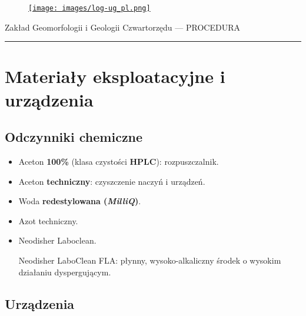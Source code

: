\documentclass[
  letterpaper,
  DIV=11,
  numbers=noendperiod]{scrreprt}
\begin{document}
\begin{figure}

\href{https://geomorfologia.ug.edu.pl}{\texttt{[image: images/log-ug\_pl.png]}}

\end{figure}

Zakład Geomorfologii i Geologii Czwartorzędu --- PROCEDURA

\begin{center}\rule{0.5\linewidth}{0.5pt}\end{center}

\hypertarget{materiaux142y-eksploatacyjne-i-urzux105dzenia-1}{%
\section{Materiały eksploatacyjne i
urządzenia}\label{materiaux142y-eksploatacyjne-i-urzux105dzenia-1}}

\hypertarget{odczynniki-chemiczne-1}{%
\subsection{Odczynniki chemiczne}\label{odczynniki-chemiczne-1}}

\begin{itemize}
\item
  Aceton \textbf{100\%} (klasa czystości \textbf{HPLC}): rozpuszczalnik.
\item
  Aceton \textbf{techniczny}: czyszczenie naczyń i urządzeń.
\item
  Woda \textbf{redestylowana (\emph{MilliQ})}.
\item
  Azot techniczny.
\item
  Neodisher Laboclean.

  Neodisher LaboClean FLA: płynny, wysoko-alkaliczny środek o wysokim
  działaniu dyspergującym.
\end{itemize}

\hypertarget{urzux105dzenia-1}{%
\subsection{Urządzenia}\label{urzux105dzenia-1}}
\end{document}
